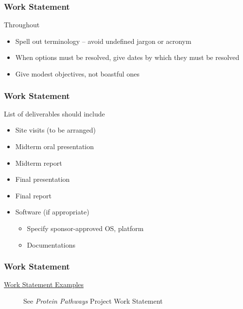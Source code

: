 \begin{frame}
    \frametitle{Work Statement}
    \begin{block}
        {Throughout}
        \begin{itemize}
            \item Spell out terminology -- avoid undefined jargon or acronym
            \item When options must be resolved, give dates by which they must
                be resolved
            \item Give modest objectives, not boastful ones
        \end{itemize}
    \end{block}
\end{frame}

\begin{frame}
    \frametitle{Work Statement}
    \begin{block}
        {List of deliverables should include}
        \begin{itemize}
            \item Site visits (to be arranged)
            \item Midterm oral presentation
            \item Midterm report
            \item Final presentation
            \item Final report
            \item Software (if appropriate) 
                \begin{itemize}
                    \item Specify sponsor-approved OS, platform
                    \item Documentations
                \end{itemize}
        \end{itemize}
    \end{block}
\end{frame}

\begin{frame}
    \frametitle{Work Statement}
    \begin{center}
        \href{http://www.ipam.ucla.edu/programs/rips2002/rips2002_projects.html}{Work Statement Examples}
    \end{center}
    \begin{description}
        \item[\quad] See \emph{Protein Pathways} Project Work Statement 
    \end{description}
\end{frame}

